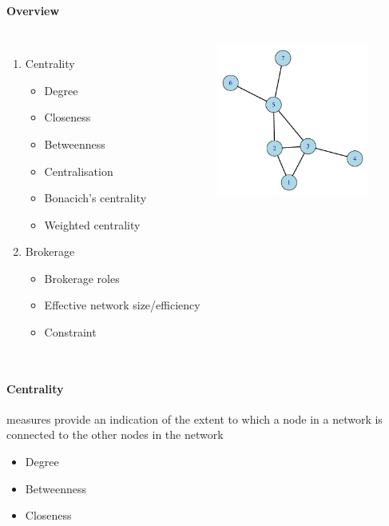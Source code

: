 \documentclass[8pt]{beamer}
\begin{document}
\begin{frame}
\frametitle{\insertsection}
\framesubtitle{Overview}

\begin{columns}

\begin{enumerate}
\item Centrality
    \begin{itemize}
    \item Degree
    \item Closeness
    \item Betweenness
    \item Centralisation
    \item Bonacich's centrality
    \item Weighted centrality
    \end{itemize}
    
\medskip    

\item Brokerage
    \begin{itemize} 
    \item Brokerage roles
    \item Effective network size/efficiency
    \item Constraint
    \end{itemize}
\end{enumerate}


\centering
\includegraphics[width=5cm]{base}\\
\color{red}{\footnotesize Note: We will focus on\\ undirected and unweighted networks}

\end{columns}

\end{frame}


\begin{frame}
\frametitle{\insertsection}
\framesubtitle{Centrality}

{\color{blue}{Centrality}} measures provide an indication of the extent to which a node in a network is connected to the other nodes in the network \cite{Freeman1978}

\medskip

\begin{itemize}
\item Degree
\item Betweenness
\item Closeness
\end{itemize}

\end{frame}
\end{document}
